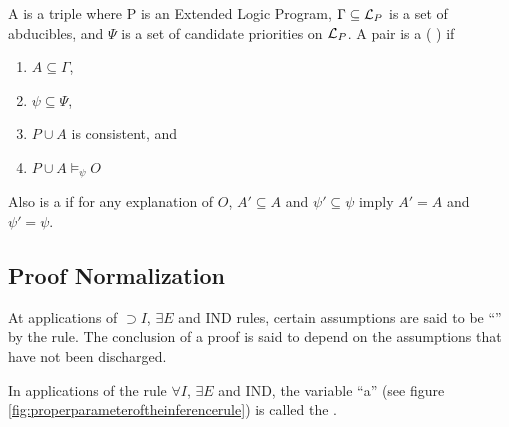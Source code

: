 \begin{defi}
A  is a triple  where P is an Extended Logic Program, $\Gamma\subseteq\mathcal{L}_P$ is a set of abducibles, and $\Psi$ is a set of candidate priorities on $\mathcal{L}_P$. A pair  is a  (\wrtTx{} ) if
\begin{enumerate}
 \item $A\subseteq\Gamma$,
 \item $\psi\subseteq\Psi$,
 \item $P\cup A$ is consistent, and 
 \item $P\cup A\vDash_\psi O$
\end{enumerate}
Also  is a  if for any explanation  of $O$, $A'\subseteq A$ and $\psi'\subseteq\psi$ imply $A'=A$ and $\psi'=\psi$.
\cite{conf/ijcai/InoueS99}
\end{defi}

\subsection{Proof Normalization}

\begin{defi}
At applications of $\supset I$, $\exists E$ and $\mbox{IND}$ rules, certain assumptions are said to be ``'' by the rule. The conclusion of a proof is said to depend on the assumptions that have not been discharged.
\cite{conf/ijcai/Goto85}
\end{defi}

\begin{defi}
In applications of the rule $\forall I$, $\exists E$ and $\mbox{IND}$, the variable ``a'' (see figure \ref{fig:properparameteroftheinferencerule}) is called the .
\cite{conf/ijcai/Goto85}
\end{defi}

